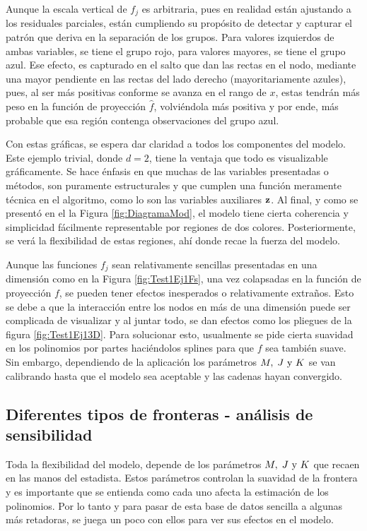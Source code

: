 \documentclass[../Main/Main.tex]{subfiles}
\begin{document}
Aunque la escala vertical de $f_j$ es arbitraria, pues en realidad  están ajustando a los residuales parciales, están cumpliendo su propósito de detectar y capturar el patrón que deriva en la separación de los grupos. Para valores izquierdos de ambas variables, se tiene el grupo rojo, para valores mayores, se tiene el grupo azul. Ese efecto, es capturado en el salto que dan las rectas en el nodo, mediante una mayor pendiente en las rectas del lado derecho (mayoritariamente azules), pues, al ser más positivas conforme se avanza en el rango de $x$, estas tendrán más peso en la función de proyección $\hat{f}$, volviéndola más positiva y por ende, más probable que esa región contenga observaciones del grupo azul.

Con estas gráficas, se espera dar claridad a todos los componentes del modelo. Este ejemplo trivial, donde $d = 2$, tiene la ventaja que todo es visualizable gráficamente. Se hace énfasis en que muchas de las variables presentadas o métodos, son puramente estructurales y que cumplen una función meramente técnica en el algoritmo, como lo son las variables auxiliares $\mathbf{z}$. Al final, y como se presentó en el la Figura \ref{fig:DiagramaMod}, el modelo tiene cierta coherencia y simplicidad fácilmente representable por regiones de dos colores. Posteriormente, se verá la flexibilidad de estas regiones, ahí donde recae la fuerza del modelo.

Aunque las funciones $f_j$ sean relativamente sencillas presentadas en una dimensión como en la Figura \ref{fig:Test1Ej1Fs}, una vez colapsadas en la función de proyección $f$, se pueden tener efectos inesperados o relativamente extraños. Esto se debe a que la interacción entre los nodos en más de una dimensión puede ser complicada de visualizar y al juntar todo, se dan efectos como los pliegues de la figura \ref{fig:Test1Ej13D}. Para solucionar esto, usualmente se pide cierta suavidad en los polinomios por partes haciéndolos splines para que $f$ sea también suave. Sin embargo, dependiendo de la aplicación los parámetros $M,\;J\text{ y }K$ se van calibrando hasta que el modelo sea aceptable y las cadenas hayan convergido. 

\subsection{Diferentes tipos de fronteras - análisis de sensibilidad } \label{sec:AnlisisSensibilidad}
Toda la flexibilidad del modelo, depende de los parámetros $M,\;J\text{ y }K$ que recaen en las manos del estadista. Estos parámetros controlan la suavidad de la frontera y es importante que se entienda como cada uno afecta la estimación de los polinomios. Por lo tanto y para pasar de esta base de datos sencilla a algunas más retadoras, se juega un poco con ellos para ver sus efectos en el modelo. 
\end{document}
